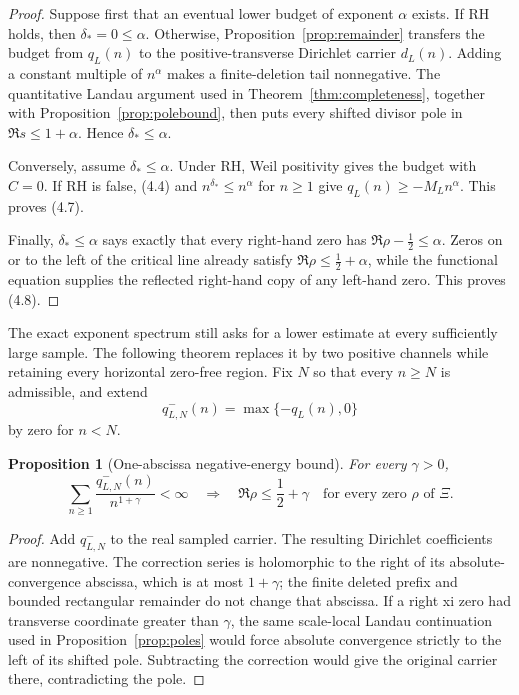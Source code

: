\documentclass[11pt]{article}
\newtheorem{proposition}[theorem]{Proposition}
\newcommand{\XiR}{\Xi}
\begin{document}
\begin{proof}
Suppose first that an eventual lower budget of exponent $\alpha$ exists.  If RH holds, then
$\delta_*=0\le\alpha$.  Otherwise, Proposition~\ref{prop:remainder} transfers the budget from
$q_L(n)$ to the positive-transverse Dirichlet carrier $d_L(n)$.  Adding a constant multiple of
$n^\alpha$ makes a finite-deletion tail nonnegative.  The quantitative Landau argument used in
Theorem~\ref{thm:completeness}, together with Proposition~\ref{prop:polebound}, then puts every
shifted divisor pole in $\Re s\le1+\alpha$.  Hence $\delta_*\le\alpha$.

Conversely, assume $\delta_*\le\alpha$.  Under RH, Weil positivity gives the budget with $C=0$.
If RH is false, (4.4) and $n^{\delta_*}\le n^\alpha$ for $n\ge1$ give
$q_L(n)\ge-M_Ln^\alpha$.  This proves (4.7).

Finally, $\delta_*\le\alpha$ says exactly that every right-hand zero has
$\Re\rho-\frac12\le\alpha$.  Zeros on or to the left of the critical line already satisfy
$\Re\rho\le\frac12+\alpha$, while the functional equation supplies the reflected right-hand
copy of any left-hand zero.  This proves (4.8).
\end{proof}

The exact exponent spectrum still asks for a lower estimate at every sufficiently large sample.
The following theorem replaces it by two positive channels while retaining every horizontal
zero-free region.  Fix $N$ so that every $n\ge N$ is
admissible, and extend
\[
 q_{L,N}^-(n)=\max\{-q_L(n),0\}
\]
by zero for $n<N$.

\begin{proposition}[One-abscissa negative-energy bound]\label{prop:one-abscissa-energy}
For every $\gamma>0$,
\[
 \sum_{n\ge1}\frac{q_{L,N}^-(n)}{n^{1+\gamma}}<\infty
 \quad\Longrightarrow\quad
 \Re\rho\le\frac12+\gamma
 \quad\text{for every zero }\rho\text{ of }\XiR.
 \tag{4.9}
\]
\end{proposition}

\begin{proof}
Add $q_{L,N}^-$ to the real sampled carrier.  The resulting Dirichlet coefficients are
nonnegative.  The correction series is holomorphic to the right of its absolute-convergence
abscissa, which is at most $1+\gamma$; the finite deleted prefix and bounded rectangular
remainder do not change that abscissa.  If a right xi zero had transverse coordinate greater
than $\gamma$, the same scale-local Landau continuation used in
Proposition~\ref{prop:poles} would force absolute convergence strictly to the left of its shifted
pole.  Subtracting the correction would give the original carrier there, contradicting the pole.
\end{proof}
\end{document}
